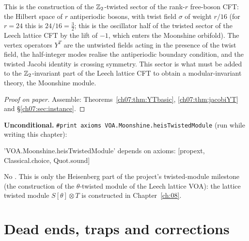 \begin{physics}
This is the construction of the ${\mathbb{Z}}_2$-twisted sector of the rank-$r$ free-boson CFT: the Hilbert space of $r$ antiperiodic bosons, with twist field $\sigma$ of weight $r/16$ (for $r=24$ this is $24/16=\tfrac32$; this is the oscillator half of the twisted sector of the Leech lattice CFT by the lift of $-1$, which enters the Moonshine orbifold). The vertex operators $Y^T$ are the untwisted fields acting in the presence of the twist field, the half-integer modes realise the antiperiodic boundary condition, and the twisted Jacobi identity is crossing symmetry. This sector is what must be added to the ${\mathbb{Z}}_2$-invariant part of the Leech lattice CFT to obtain a modular-invariant theory, the Moonshine module.
\end{physics}

\begin{proof}[Proof on paper]
Assemble: Theorems~\ref{ch07:thm:YTbasic}, \ref{ch07:thm:jacobiYT} and \S\ref{ch07:sec:instance}.
\end{proof}

\begin{status}
\textbf{Unconditional.} \verb|#print axioms VOA.Moonshine.heisTwistedModule| (run while writing
this chapter):
\begin{plaincode}
'VOA.Moonshine.heisTwistedModule' depends on axioms: [propext, Classical.choice, Quot.sound]
\end{plaincode}
No . This is only the Heisenberg part of the project's twisted-module milestone (the construction of the $\theta$-twisted
module of the Leech lattice VOA): the lattice twisted module
$S[\theta]\otimes T$ is constructed in Chapter~\ref{ch:08}.
\end{status}

\section{Dead ends, traps and corrections}\label{ch07:sec:deadends}

